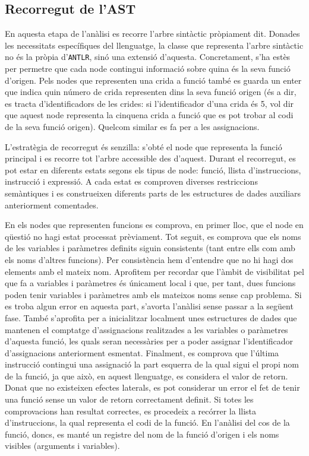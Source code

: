 \subsection{Recorregut de l'AST}

En aquesta etapa de l'anàlisi es recorre l'arbre sintàctic pròpiament dit. 
Donades les necessitats específiques del llenguatge, la classe que representa 
l'arbre sintàctic no és la pròpia d'\texttt{ANTLR}, sinó una extensió 
d'aquesta. Concretament, s'ha estès per permetre que cada node contingui 
informació sobre quina és la seva funció d'origen. Pels nodes que representen 
una crida a funció també es guarda un enter que indica quin número de crida 
representen dins la seva funció origen (és a dir, es tracta d'identificadors 
de les crides: si l'identificador d'una crida és 5, vol dir que aquest node 
representa la cinquena crida a funció que es pot trobar al codi de la seva 
funció origen). Quelcom similar es fa per a les assignacions.

L'estratègia de recorregut és senzilla: s'obté el node que representa la 
funció principal i es recorre tot l'arbre accessible des d'aquest. Durant el 
recorregut, es pot estar en diferents estats segons els tipus de node: funció, 
llista d'instruccions, instrucció i expressió. A cada estat es comproven 
diverses restriccions semàntiques i es construeixen diferents parts de les 
estructures de dades auxiliars anteriorment comentades.

En els nodes que representen funcions es comprova, en primer lloc, que el node 
en qüestió no hagi estat processat prèviament. Tot seguit, es comprova que els 
noms de les variables i paràmetres definits siguin consistents (tant entre 
ells com amb els noms d'altres funcions). Per consistència hem d'entendre que 
no hi hagi dos elements amb el mateix nom. Aprofitem per recordar que l'àmbit 
de visibilitat pel que fa a variables i paràmetres és únicament local i que, 
per tant, dues funcions poden tenir variables i paràmetres amb els mateixos 
noms sense cap problema. Si es troba algun error en aquesta part, s'avorta 
l'anàlisi sense passar a la següent fase. També s'aprofita per a inicialitzar 
localment unes estructures de dades que mantenen el comptatge d'assignacions 
realitzades a les variables o paràmetres d'aquesta funció, les quals seran 
necessàries per a poder assignar l'identificador d'assignacions anteriorment 
esmentat. Finalment, es comprova que l'última instrucció contingui una 
assignació la part esquerra de la qual sigui el propi nom de la funció, ja que 
això, en aquest llenguatge, es considera el valor de retorn. Donat que no 
existeixen efectes laterals, es pot considerar un error el fet de tenir una 
funció sense un valor de retorn correctament definit. Si totes les 
comprovacions han resultat correctes, es procedeix a recórrer la llista 
d'instruccions, la qual representa el codi de la funció. En l'anàlisi del cos 
de la funció, doncs, es manté un registre del nom de la funció d'origen i els 
noms visibles (arguments i variables).

